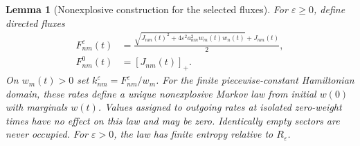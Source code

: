 \documentclass[11pt,oneside,openany]{book}
\newtheorem{lemma}[theorem]{Lemma}
\theoremstyle{definition}
\theoremstyle{remark}\newtheorem{remark}[theorem]{Remark}
\begin{document}
\begin{lemma}[Nonexplosive construction for the selected fluxes]
\label{stat:existence}
For $\varepsilon\geq0$, define directed fluxes
\begin{align}
 F^\varepsilon_{nm}(t)
 &=\frac{\sqrt{J_{nm}(t)^2+
            4\varepsilon^2a_{nm}^2w_m(t)w_n(t)}+J_{nm}(t)}{2},
                                                        \label{stat:flux}\\
 F^0_{nm}(t)&=[J_{nm}(t)]_+.
\end{align}
On $w_m(t)>0$ set $k^\varepsilon_{nm}=F^\varepsilon_{nm}/w_m$.
For the finite piecewise-constant Hamiltonian domain, these rates define a
unique nonexplosive Markov law from initial $w(0)$ with marginals $w(t)$.
Values assigned to outgoing rates at isolated zero-weight times have no
effect on this law and may be zero. Identically empty sectors are never
occupied. For $\varepsilon>0$, the law has finite entropy relative to
$R_\varepsilon$.
\end{lemma}
\end{document}
